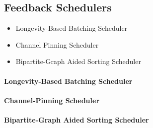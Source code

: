 \subsection{Feedback Schedulers}

\begin{slide}
    \begin{itemize}
        \item Longevity-Based Batching Scheduler
        \item Channel Pinning Scheduler
        \item Bipartite-Graph Aided Sorting Scheduler
    \end{itemize}
\end{slide}


\begin{slide}
    \framesubtitle{Longevity-Based Batching Scheduler}
\end{slide}


\begin{slide}
    \framesubtitle{Channel-Pinning Scheduler}
\end{slide}


\begin{slide}
    \framesubtitle{Bipartite-Graph Aided Sorting Scheduler}
\end{slide}
















